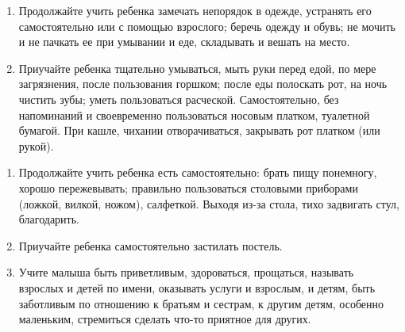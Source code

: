 \documentclass[a5paper]{book}
\begin{document}
\begin{enumerate}
\def\labelenumi{\arabic{enumi}.}
\item
  
  Продолжайте учить ребенка замечать непорядок в одежде, устранять его
  самостоятельно или с помощью взрослого; беречь одежду и обувь; не
  мочить и не пачкать ее при умывании и еде, складывать и вешать на
  место.
  
\item
  
  Приучайте ребенка тщательно умываться, мыть руки перед едой, по мере
  загрязнения, после пользования горшком; после еды полоскать рот, на
  ночь чистить зубы; уметь пользоваться расческой. Самостоятельно, без
  напоминаний и своевременно пользоваться носовым платком, туалетной
  бумагой. При кашле, чихании отворачиваться, закрывать рот платком (или
  рукой).
  
\end{enumerate}

\begin{enumerate}
\def\labelenumi{\arabic{enumi}.}
\setcounter{enumi}{2}
\item
  
  Продолжайте учить ребенка есть самостоятельно: брать пищу понемногу,
  хорошо пережевывать; правильно пользоваться столовыми приборами
  (ложкой, вилкой, ножом), салфеткой. Выходя из-за стола, тихо задвигать
  стул, благодарить.
  
\item
  
  Приучайте ребенка самостоятельно застилать постель.
  
\item
  
  Учите малыша быть приветливым, здороваться, прощаться, называть
  взрослых и детей по имени, оказывать услуги и взрослым, и детям, быть
  заботливым по отношению к братьям и сестрам, к другим детям, особенно
  маленьким, стремиться сделать что-то приятное для других.
  
\end{enumerate}
\end{document}
